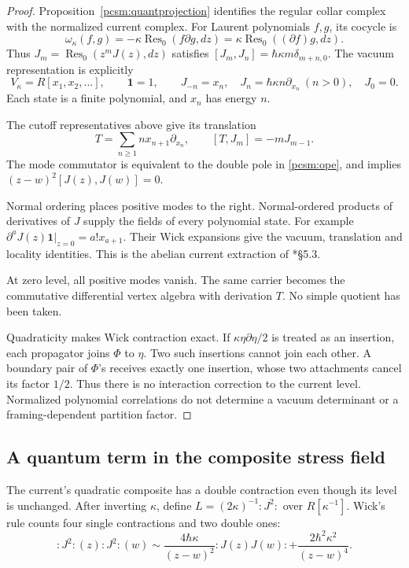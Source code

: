 \begin{proof}
Proposition~\ref{pcsm:quantprojection} identifies the regular collar
complex with the normalized current complex.
For Laurent polynomials \(f,g\), its cocycle is
\[
 \omega_\kappa(f,g)
  =-\kappa\operatorname{Res}_0(f\partial g,dz)
  =\kappa\operatorname{Res}_0((\partial f)g,dz).
\]
Thus \(J_m=\operatorname{Res}_0(z^mJ(z),dz)\) satisfies
\([J_m,J_n]=\hbar\kappa m\delta_{m+n,0}\).
The vacuum representation is explicitly
\[
 V_\kappa=R[x_1,x_2,\ldots],\qquad \mathbf1=1,
 \qquad
 J_{-n}=x_n,\quad
 J_n=\hbar\kappa n\partial_{x_n}\ (n>0),\quad J_0=0.
\]
Each state is a finite polynomial, and \(x_n\) has energy \(n\).

The cutoff representatives above give its translation
\[
 T=\sum_{n\geq1}n x_{n+1}\partial_{x_n},\qquad
 [T,J_m]=-mJ_{m-1}.
\]
The mode commutator is equivalent to the double pole in
\eqref{pcsm:ope}, and implies
\((z-w)^2[J(z),J(w)]=0\).

Normal ordering places positive modes to the right.
Normal-ordered products of derivatives of \(J\) supply the fields
of every polynomial state. For example
\(\partial^aJ(z)\mathbf1|_{z=0}=a!x_{a+1}\).
Their Wick expansions give the vacuum, translation and locality
identities. This is the abelian current extraction of
\cite{pcsm:GRW}*{\S5.3}.

At zero level, all positive modes vanish.
The same carrier becomes the commutative differential vertex algebra
with derivation \(T\). No simple quotient has been taken.

Quadraticity makes Wick contraction exact.
If \(\kappa\eta\partial\eta/2\) is treated as an insertion,
each propagator joins \(\Phi\) to \(\eta\).
Two such insertions cannot join each other.
A boundary pair of \(\Phi\)'s receives exactly one insertion,
whose two attachments cancel its factor \(1/2\).
Thus there is no interaction correction to the current level.
Normalized polynomial correlations do not determine a vacuum
determinant or a framing-dependent partition factor.
\end{proof}



\subsection{A quantum term in the composite stress field}

The\label{pcsm:def:composite-stress} current's quadratic composite has a double contraction even
though its level is unchanged.
After inverting \(\kappa\), define
\(L=(2\kappa)^{-1}:J^2:\) over \(R[\kappa^{-1}]\).
Wick's rule counts four single contractions and two double ones:
\[
 :J^2:(z):J^2:(w)\sim
 \frac{4\hbar\kappa}{(z-w)^2}:J(z)J(w):
       +\frac{2\hbar^2\kappa^2}{(z-w)^4}.
\]

